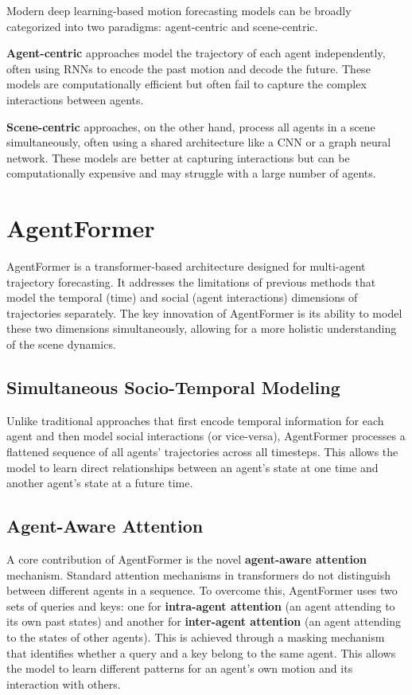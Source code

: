 Modern deep learning-based motion forecasting models can be broadly categorized into two paradigms: agent-centric and scene-centric.

\textbf{Agent-centric} approaches model the trajectory of each agent independently, often using RNNs to encode the past motion and decode the future. These models are computationally efficient but often fail to capture the complex interactions between agents.

\textbf{Scene-centric} approaches, on the other hand, process all agents in a scene simultaneously, often using a shared architecture like a CNN or a graph neural network. These models are better at capturing interactions but can be computationally expensive and may struggle with a large number of agents.

\section{AgentFormer}

AgentFormer \citep{yuan2021agentformer} is a transformer-based architecture designed for multi-agent trajectory forecasting. It addresses the limitations of previous methods that model the temporal (time) and social (agent interactions) dimensions of trajectories separately. The key innovation of AgentFormer is its ability to model these two dimensions simultaneously, allowing for a more holistic understanding of the scene dynamics.

\subsection{Simultaneous Socio-Temporal Modeling}

Unlike traditional approaches that first encode temporal information for each agent and then model social interactions (or vice-versa), AgentFormer processes a flattened sequence of all agents' trajectories across all timesteps. This allows the model to learn direct relationships between an agent's state at one time and another agent's state at a future time.

\subsection{Agent-Aware Attention}

A core contribution of AgentFormer is the novel \textbf{agent-aware attention} mechanism. Standard attention mechanisms in transformers do not distinguish between different agents in a sequence. To overcome this, AgentFormer uses two sets of queries and keys: one for \textbf{intra-agent attention} (an agent attending to its own past states) and another for \textbf{inter-agent attention} (an agent attending to the states of other agents). This is achieved through a masking mechanism that identifies whether a query and a key belong to the same agent. This allows the model to learn different patterns for an agent's own motion and its interaction with others.

